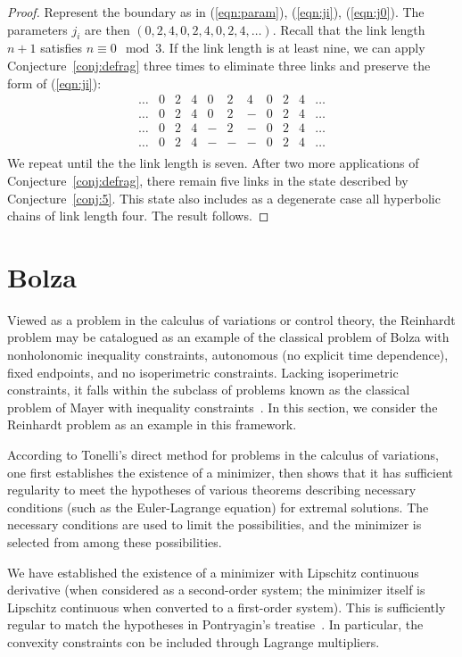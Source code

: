 \documentclass[11pt]{amsart}
\begin{document}
\begin{proof}  Represent the boundary as in (\ref{eqn:param}),
(\ref{eqn:ji}), (\ref{eqn:j0}).  The parameters $j_i$ are then
$(0,2,4,0,2,4,0,2,4,\ldots)$.  Recall that the link length $n+1$
satisfies
$n\equiv 0\mod 3$.  If the link length is at least nine,
we can apply Conjecture~\ref{conj:defrag} three times to eliminate
three links and preserve the form of (\ref{eqn:ji}):
$$
\begin{array}{llllllllllll}
 \ldots &0&2 & 4 & 0 & 2 & 4 & 0 & 2 &4&\ldots \\
 \ldots &0&2 & 4 & 0 & 2 & - & 0 & 2 &4&\ldots \\
 \ldots &0&2 & 4 & - & 2 & - & 0 & 2 &4&\ldots \\
 \ldots &0&2 & 4 & - & - & - & 0 & 2 &4&\ldots \\
\end{array}
$$
We repeat until the the link length is seven.  After two more
applications of Conjecture~\ref{conj:defrag}, there remain
five links in the state described by Conjecture~\ref{conj:5}.
This state also includes as a degenerate case 
all hyperbolic chains of link length four.
The result follows.
\end{proof}


\section{Bolza}


Viewed as a problem in the calculus of variations or control theory, the Reinhardt problem may be catalogued as an example of the classical problem of Bolza with nonholonomic inequality constraints, autonomous (no explicit time dependence), fixed endpoints, and no isoperimetric constraints.  Lacking isoperimetric constraints, it falls within the subclass of problems known as the classical problem of Mayer with inequality constraints~\cite[Ch.7]{He}.    In this section, we consider the Reinhardt problem as an example in this framework.

According to Tonelli's direct method for problems in the calculus of variations, one first establishes the existence of a minimizer, then shows that it has sufficient regularity to meet the hypotheses of various theorems describing necessary conditions (such as the Euler-Lagrange equation) for extremal solutions.  The necessary conditions are used to limit the possibilities, and the minimizer is selected from among these possibilities.  

We have established the existence of a minimizer with Lipschitz continuous derivative (when considered as a second-order system;  the minimizer itself is Lipschitz continuous when converted to a first-order system).  This is sufficiently regular to match the hypotheses in Pontryagin's treatise~\cite{Po}.  In particular, the convexity constraints con be included through Lagrange multipliers.
\end{document}
